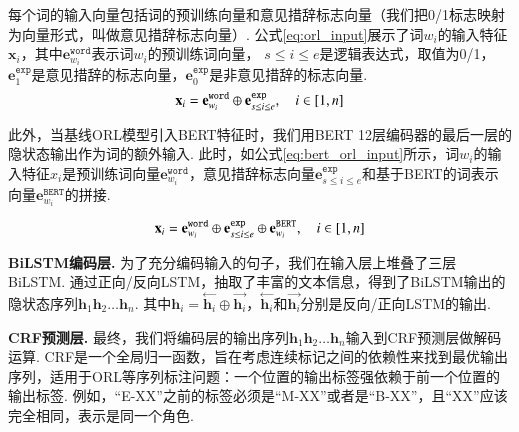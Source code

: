 每个词的输入向量包括词的预训练向量和意见措辞标志向量（我们把0/1标志映射为向量形式，叫做意见措辞标志向量）. 公式\ref{eq:orl_input}展示了词$w_i$的输入特征$\mathbf{x}_i$，其中$\mathbf{e}_{w_i}^{\texttt{word}}$表示词$w_i$的预训练词向量， $s\leq i\leq e$是逻辑表达式，取值为0/1，$\mathbf{e}_1^{\texttt{exp}}$是意见措辞的标志向量，$\mathbf{e}_0^{\texttt{exp}}$是非意见措辞的标志向量.
\begin{equation}
    \setlength{\abovedisplayskip}{9pt}
    \setlength{\belowdisplayskip}{9pt}
    \label{eq:orl_input}
    \mathbf{x}_i = \mathbf{e}_{w_i}^{\texttt{word}} \oplus \mathbf{e}_{s\leq i\leq e}^{\texttt{exp}}, \quad i \in [1,n]
\end{equation}

此外，当基线ORL模型引入BERT特征时，我们用BERT 12层编码器的最后一层的隐状态输出作为词的额外输入. 此时，如公式\ref{eq:bert_orl_input}所示，词$w_i$的输入特征$x_i$是预训练词向量$\mathbf{e}_{w_i}^{\texttt{word}}$，意见措辞标志向量$\mathbf{e}_{s\leq i\leq e}^{\texttt{exp}}$和基于BERT的词表示向量$\mathbf{e}_{w_i}^{\texttt{BERT}}$的拼接.

\begin{equation}
    \setlength{\abovedisplayskip}{9pt}
    \setlength{\belowdisplayskip}{9pt}
    \label{eq:bert_orl_input}
    \mathbf{x}_i = \mathbf{e}_{w_i}^{\texttt{word}} \oplus \mathbf{e}_{s\leq i\leq e}^{\texttt{exp}} \oplus \mathbf{e}_{w_i}^{\texttt{BERT}}, \quad i \in [1,n]
\end{equation}

\textbf{BiLSTM编码层.  } 为了充分编码输入的句子，我们在输入层上堆叠了三层BiLSTM.
通过正向/反向LSTM，抽取了丰富的文本信息，得到了BiLSTM输出的隐状态序列$\mathbf{h}_1 \mathbf{h}_2\dots \mathbf{h}_n$. 其中$\mathbf{h}_i=\stackrel{\leftarrow}{\mathbf{h}_i} \oplus \stackrel{\rightarrow}{\mathbf{h}_i}$，$\stackrel{\leftarrow}{\mathbf{h}_i}$和$\stackrel{\rightarrow}{\mathbf{h}_i}$分别是反向/正向LSTM的输出.

\textbf{CRF预测层.  }
最终，我们将编码层的输出序列$\mathbf{h}_1 \mathbf{h}_2\dots \mathbf{h}_n$输入到CRF预测层做解码运算. CRF是一个全局归一函数，旨在考虑连续标记之间的依赖性来找到最优输出序列，适用于ORL等序列标注问题：一个位置的输出标签强依赖于前一个位置的输出标签. 例如，“E-XX”之前的标签必须是“M-XX”或者是“B-XX”，且“XX”应该完全相同，表示是同一个角色.

